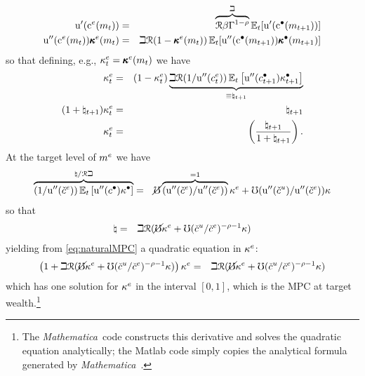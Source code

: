 \documentclass{handout}
\begin{document}
\begin{eqnarray}
  {\ensuremath{\mathrm{u}^{\prime}}}(\mathrm{c}^{e}(m_{t})) & = & \overbrace{\mathcal{R} \beta \Gamma^{1-\rho}}^{\beth} \operatorname{\mathbb{E}}_{t}[{\mathrm{u}^{\prime}}(\mathrm{c}^{\bullet}(m_{t+1}))]
\\  {\mathrm{u}}^{\prime\prime}(\mathrm{c}^{e}(m_{t}))\pmb{\kappa}^{e}(m_{t}) & = & \beth  \mathcal{R} (1-\pmb{\kappa}^{e}(m_{t}))\operatorname{\mathbb{E}}_{t}[{\mathrm{u}}^{\prime\prime}(\mathrm{c}^{\bullet}(m_{t+1}))\pmb{\kappa}^{\bullet}(m_{t+1})] \label{eq:dEuler}
\end{eqnarray}
so that defining, e.g., $\kappa^{e}_{t} = \pmb{\kappa}^{e}(m_{t})$ we have 
\begin{eqnarray}
 \kappa^{e}_{t} & = &  (1-\kappa^{e}_{t}) \underbrace{\beth \mathcal{R} (1/{\mathrm{u}^{\prime\prime}}(c^{e}_{t}))\operatorname{\mathbb{E}}_{t}\left[{\mathrm{u}^{\prime\prime}}(c^{\bullet}_{t+1})\kappa^{\bullet}_{t+1}\right]}_{\equiv \natural_{t+1}} \label{eq:natural}
\\ (1+\natural_{t+1})\kappa^{e}_{t} & = & \natural_{t+1} \label{eq:naturalMPC}
\\ \kappa^{e}_{t} & = & \left(\frac{\natural_{t+1}}{1+\natural_{t+1}}\right) \label{eq:naturalSolved}
.
\end{eqnarray}
\newcommand{\Mma}{{\it Mathematica}~}
At the target level of $m^{e}$ we have 
\begin{eqnarray*}
  \overbrace{(1/{\mathrm{u}^{\prime\prime}}(\check{c}^{e}))\operatorname{\mathbb{E}}_{t}\left[{\mathrm{u}^{\prime\prime}}(c^{\bullet})\kappa^{\bullet}\right]}^{\natural / \mathcal{R} \beth} & = & \cancel{\mho} \overbrace{({\mathrm{u}^{\prime\prime}}(\check{c}^{e})/{\mathrm{u}^{\prime\prime}}(\check{c}^{e}))}^{=1}\kappa^{e}+\mho ({\mathrm{u}^{\prime\prime}}(\check{c}^{u})/{\mathrm{u}^{\prime\prime}}(\check{c}^{e}))\kappa
\end{eqnarray*}
so that 
\begin{eqnarray}
  \natural & = &  \beth \mathcal{R} (\cancel{\mho} \kappa^{e} + \mho (\check{c}^{u}/\check{c}^{e})^{-\rho-1} \kappa)
\end{eqnarray}
yielding from \eqref{eq:naturalMPC} a quadratic equation in $\kappa^{e}$:
\begin{eqnarray}
  \left(1+\beth \mathcal{R} (\cancel{\mho} \kappa^{e} + \mho (\check{c}^{u}/\check{c}^{e})^{-\rho-1}  \kappa) \right)\kappa^{e} & = & \beth \mathcal{R} (\cancel{\mho} \kappa^{e} + \mho (\check{c}^{u}/\check{c}^{e})^{-\rho-1} \kappa) \label{eq:quadraticForTargetMPC}
\end{eqnarray} 
which has one solution for $\kappa^{e}$ in the interval $[0,1]$, which is the MPC at target wealth.\footnote{The 
\Mma code constructs this derivative and solves the quadratic equation analytically; the Matlab code simply copies
the analytical formula generated by \Mma.}
\end{document}
